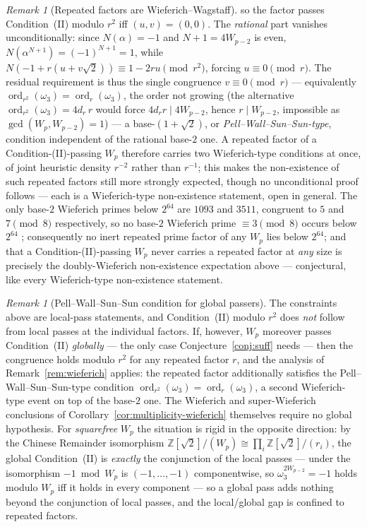\documentclass[11pt]{amsart}
\theoremstyle{plain}
\theoremstyle{definition}
\theoremstyle{remark}
\newtheorem{remark}[theorem]{Remark}
\numberwithin{equation}{section}
\newcommand{\ord}{\operatorname{ord}}
\newcommand{\Z}{\mathbb{Z}}
\begin{document}
\begin{remark}[Repeated factors are Wieferich--Wagstaff]
so the factor passes Condition~(II) modulo $r^2$ iff $(u, v) = (0, 0)$. The \emph{rational} part vanishes unconditionally: since $N(\alpha) = -1$ and $N + 1 = 4 W_{p-2}$ is even, $N(\alpha^{N+1}) = (-1)^{N+1} = 1$, while $N(-1 + r(u + v\sqrt 2)) \equiv 1 - 2 r u \pmod{r^2}$, forcing $u \equiv 0 \pmod r$. The residual requirement is thus the single congruence $v \equiv 0 \pmod r$ --- equivalently $\ord_{r^2}(\omega_3) = \ord_r(\omega_3)$, the order not growing (the alternative $\ord_{r^2}(\omega_3) = 4 d_r\, r$ would force $4 d_r r \mid 4 W_{p-2}$, hence $r \mid W_{p-2}$, impossible as $\gcd(W_p, W_{p-2}) = 1$) --- a base-$(1+\sqrt 2)$, or \emph{Pell--Wall--Sun--Sun-type}, condition independent of the rational base-$2$ one. A repeated factor of a Condition-(II)-passing $W_p$ therefore carries two Wieferich-type conditions at once, of joint heuristic density $r^{-2}$ rather than $r^{-1}$; this makes the non-existence of such repeated factors still more strongly expected, though no unconditional proof follows --- each is a Wieferich-type non-existence statement, open in general. The only base-$2$ Wieferich primes below $2^{64}$ are $1093$ and $3511$, congruent to $5$ and $7 \pmod 8$ respectively, so no base-$2$ Wieferich prime $\equiv 3 \pmod 8$ occurs below $2^{64}$ \cite{ref:OEISWieferich}; consequently no inert repeated prime factor of any $W_p$ lies below $2^{64}$; and that a Condition-(II)-passing $W_p$ never carries a repeated factor at \emph{any} size is precisely the doubly-Wieferich non-existence expectation above --- conjectural, like every Wieferich-type non-existence statement.
\end{remark}

\begin{remark}[Pell--Wall--Sun--Sun condition for global passers]\label{rem:pell-wss-global}
The constraints above are local-pass statements, and Condition~(II) modulo $r^2$ does \emph{not} follow from local passes at the individual factors. If, however, $W_p$ moreover passes Condition~(II) \emph{globally} --- the only case Conjecture~\ref{conj:suff} needs --- then the congruence holds modulo $r^2$ for any repeated factor $r$, and the analysis of Remark~\ref{rem:wieferich} applies: the repeated factor additionally satisfies the Pell--Wall--Sun--Sun-type condition $\ord_{r^2}(\omega_3) = \ord_r(\omega_3)$, a second Wieferich-type event on top of the base-$2$ one. The Wieferich and super-Wieferich conclusions of Corollary~\ref{cor:multiplicity-wieferich} themselves require no global hypothesis. For \emph{squarefree} $W_p$ the situation is rigid in the opposite direction: by the Chinese Remainder isomorphism $\Z[\sqrt 2]/(W_p) \cong \prod_i \Z[\sqrt 2]/(r_i)$, the global Condition~(II) is \emph{exactly} the conjunction of the local passes --- under the isomorphism $-1 \bmod W_p$ is $(-1, \dots, -1)$ componentwise, so $\omega_3^{2 W_{p-2}} = -1$ holds modulo $W_p$ iff it holds in every component --- so a global pass adds nothing beyond the conjunction of local passes, and the local/global gap is confined to repeated factors.
\end{remark}
\end{document}
